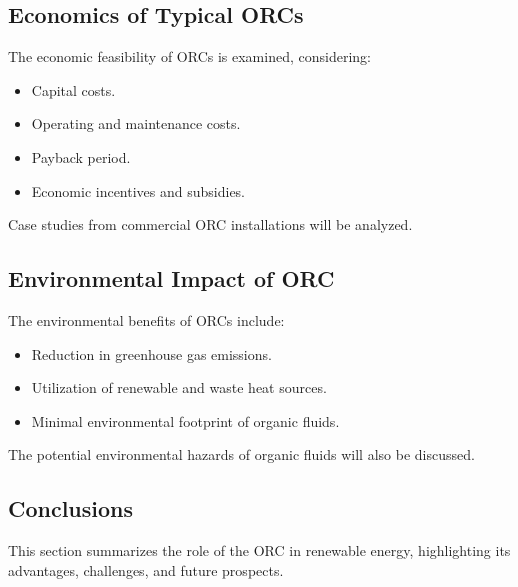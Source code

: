 \documentclass[letterpaper,10pt,english]{jupyterBook}
\begin{document}
\subsection{Economics of Typical ORCs}
\label{\detokenize{ProjectInstructions:economics-of-typical-orcs}}
\sphinxAtStartPar
The economic feasibility of ORCs is examined, considering:
\begin{itemize}
\item {} 
\sphinxAtStartPar
Capital costs.

\item {} 
\sphinxAtStartPar
Operating and maintenance costs.

\item {} 
\sphinxAtStartPar
Payback period.

\item {} 
\sphinxAtStartPar
Economic incentives and subsidies.

\end{itemize}

\sphinxAtStartPar
Case studies from commercial ORC installations will be analyzed.


\subsection{Environmental Impact of ORC}
\label{\detokenize{ProjectInstructions:environmental-impact-of-orc}}
\sphinxAtStartPar
The environmental benefits of ORCs include:
\begin{itemize}
\item {} 
\sphinxAtStartPar
Reduction in greenhouse gas emissions.

\item {} 
\sphinxAtStartPar
Utilization of renewable and waste heat sources.

\item {} 
\sphinxAtStartPar
Minimal environmental footprint of organic fluids.

\end{itemize}

\sphinxAtStartPar
The potential environmental hazards of organic fluids will also be
discussed.


\subsection{Conclusions}
\label{\detokenize{ProjectInstructions:conclusions}}
\sphinxAtStartPar
This section summarizes the role of the ORC in renewable energy,
highlighting its advantages, challenges, and future prospects.
\end{document}
